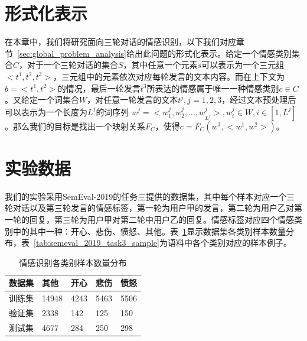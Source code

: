 \section{形式化表示}
\label{sec:exp_context_emo_format}

在本章中，我们将研究面向三轮对话的情感识别，以下我们对应章节~\ref{sec:global_problem_analysis}给出此问题的形式化表示。给定一个情感类别集合$C$，对于一个三轮对话的集合$S$，其中任意一个元素$s$可以表示为一个三元组$<t^1, t^2, t^3>$，三元组中的元素依次对应每轮发言的文本内容。而在上下文为$b=<t^1, t^2>$的情况，最后一轮发言$t^3$所表达的情感属于唯一一种情感类别$c \in C$。又给定一个词集合$W$，对任意一轮发言的文本$t^j, j=1,2,3$，经过文本预处理后可以表示为一个长度为$L^j$的词序列 $w^j = <w^j_1, w^j_2, ..., w^j_{L^j}>, w^j_i \in W, i \in [1, L^j]$。那么我们的目标是找出一个映射关系$F_C$，使得$c=F_C(w^3, <w^1, w^2>)$。

\section{实验数据}
\label{sec:exp_context_emo_data}

我们的实验采用SemEval-2019的任务三提供的数据集，其中每个样本对应一个三轮对话以及第三轮发言的情感标签，第一轮为用户甲的发言，第二轮为用户乙对第一轮的回复，第三轮为用户甲对第二轮中用户乙的回复。情感标签对应四个情感类别中的其中一种：开心、悲伤、愤怒、其他。表~\ref{tab:semeval_2019_task3_data}显示数据集各类别样本数量分布，表~\ref{tab:semeval_2019_task3_sample}为语料中各个类别对应的样本例子。

\begin{table}[htb]
  \centering
  \begin{minipage}[t]{0.8\linewidth}
  \caption{情感识别各类别样本数量分布}
  \label{tab:semeval_2019_task3_data}
    \begin{tabularx}{\linewidth}{X|XXXX}
    \toprule[1.5pt]
    数据集 & 其他 & 开心 & 悲伤 & 愤怒 \\  
    \hline
    训练集 & 14948 & 4243 & 5463 & 5506 \\
    验证集 & 2338 & 142 & 125 & 150 \\
    测试集 & 4677 & 284 & 250 & 298 \\
    \bottomrule[1.5pt]
    \end{tabularx}
  \end{minipage}
\end{table}


